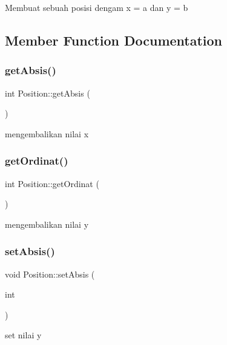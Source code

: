 Membuat sebuah posisi dengam x = a dan y = b 

\subsection{Member Function Documentation}
\mbox{\label{class_position_ae0b87342402a20f3ea98d4358619c110}} 
\subsubsection{\texorpdfstring{getAbsis()}{getAbsis()}}
{\footnotesize\ttfamily int Position\+::get\+Absis (\begin{DoxyParamCaption}{ }\end{DoxyParamCaption})}

mengembalikan nilai x \mbox{\label{class_position_a7a6338c4b0f28195ff2c5a975b9514b2}} 
\subsubsection{\texorpdfstring{getOrdinat()}{getOrdinat()}}
{\footnotesize\ttfamily int Position\+::get\+Ordinat (\begin{DoxyParamCaption}{ }\end{DoxyParamCaption})}

mengembalikan nilai y \mbox{\label{class_position_a0e0d7c4dc5bb161361461f10e0a9c8e0}} 
\subsubsection{\texorpdfstring{setAbsis()}{setAbsis()}}
{\footnotesize\ttfamily void Position\+::set\+Absis (\begin{DoxyParamCaption}\item[{int}]{ }\end{DoxyParamCaption})}

set nilai y \mbox{\label{class_position_af45a9ea26ffa9a02f8f06c7fa4c7285e}} 
